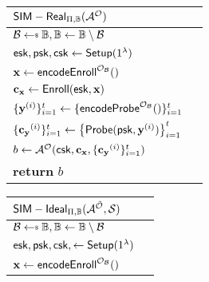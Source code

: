 \begin{figure}[h]
	\begin{center}

		\begin{subfigure}[t]{0.49\textwidth}
		\begin{tabular}{l c}
			${\sf SIM-Real}_{\Pi, \mathbb{B}}(\mathcal{A}^\mathcal{O})$\\

			\hline

			$\mathcal{B} \getsdollar \mathbb{B}, \mathbb{B} \gets \mathbb{B} \setminus \mathcal{B}$ \\

			${\sf esk}, {\sf psk}, {\sf csk} \gets {\sf Setup}(1^\lambda)$ \\

			$\mathbf{x} \gets {\sf encodeEnroll}^{\mathcal{O}_{\mathcal{B}}}()$ \\

			$\mathbf{c_x} \gets {\sf Enroll}({\sf esk}, \mathbf{x})$ \\

			$\{\mathbf{y}^{(i)}\}_{i=1}^t \gets \{{\sf encodeProbe}^{\mathcal{O}_{\mathcal{B}}}() \}_{i=1}^t $ \\
			
			$\{ \mathbf{c_y}^{(i)} \}_{i=1}^t \gets \left\{ {\sf Probe}( {\sf psk}, \mathbf{y}^{(i)} ) \right \}_{i=1}^t$ \\

			$b \gets \mathcal{A}^\mathcal{O} ({\sf csk}, \mathbf{c_x}, \{\mathbf{c_y}^{(i)}\}_{i=1}^t )$ \\

			\textbf{return} $b$
			
		\end{tabular}
		\end{subfigure}
		\begin{subfigure}[t]{0.49\textwidth}
		\begin{tabular}{l c}
			${\sf SIM-Ideal}_{\Pi, \mathbb{B}}(\mathcal{A}^{\tilde{\mathcal{O}}}, \mathcal{S} )$\\

			\hline

			$\mathcal{B} \getsdollar \mathbb{B}, \mathbb{B} \gets \mathbb{B} \setminus \mathcal{B}$ \\

			${\sf esk}, {\sf psk}, {\sf csk}, \gets {\sf Setup}(1^\lambda)$ \\

			$ \mathbf{x} \gets {\sf encodeEnroll}^{\mathcal{O}_{\mathcal{B}}}()$ \\


\end{tabular}
\end{subfigure}
\end{center}
\end{figure}
